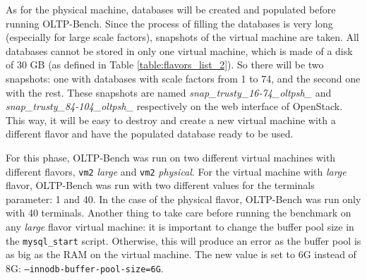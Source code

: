 As for the physical machine, databases will be created and populated before running OLTP-Bench. 
Since the process of filling the databases is very long (especially for large scale factors), snapshots of the virtual machine are taken.
All databases cannot be stored in only one virtual machine, which is made of a disk of 30 GB (as defined in Table \ref{table:flavors_list_2}).
So there will be two snapshots: one with databases with scale factors from 1 to 74, and the second one with the rest.
These snapshots are named \textit{snap\_trusty\_16-74\_oltpsh\_} and \textit{snap\_trusty\_84-104\_oltpsh\_} respectively on the web interface of OpenStack.
This way, it will be easy to destroy and create a new virtual machine with a different flavor and have the populated database ready to be used.

For this phase, OLTP-Bench was run on two different virtual machines with different flavors, \texttt{vm2} \textit{large} and \texttt{vm2} \textit{physical}. 
For the virtual machine with \textit{large} flavor, OLTP-Bench was run with two different values for the terminals parameter: 1 and 40.
In the case of the physical flavor, OLTP-Bench was run only with 40 terminals.
Another thing to take care before running the benchmark on any \textit{large} flavor virtual machine: it is important to change the buffer pool size in the \texttt{mysql\_start} script. 
Otherwise, this will produce an error as the buffer pool is as big as the RAM on the virtual machine.
The new value is set to 6G instead of 8G: \texttt{--innodb-buffer-pool-size=6G}.

